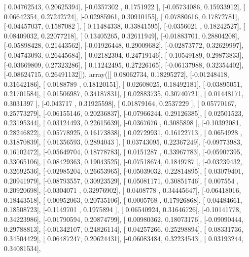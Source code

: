 \documentclass{article}
\begin{document}
       [ 0.04762543,  0.20625394],
       [-0.0357302 ,  0.1751922 ],
       [-0.05734086,  0.15933912],
       [ 0.06642354,  0.27242724],
       [-0.02985961,  0.30910155],
       [ 0.07880616,  0.17872781],
       [-0.04457037,  0.1587082 ],
       [ 0.11484338,  0.33841595],
       [-0.0356021 ,  0.18242527],
       [ 0.08409032,  0.22077218],
       [ 0.13405265,  0.32611949],
       [-0.01883701,  0.28804208],
       [-0.05898428,  0.21443562],
       [-0.01926448,  0.29009682],
       [-0.02873772,  0.32629997],
       [-0.04743093,  0.26445684],
       [ 0.02182304,  0.24719146],
       [ 0.10549189,  0.29873833],
       [-0.03669809,  0.27323286],
       [ 0.11242495,  0.27226165],
       [-0.06137988,  0.32354402],
       [-0.08624715,  0.26491132]]), array([[ 0.08062734,  0.18295272],
       [-0.01248418,  0.31642186],
       [ 0.0188789 ,  0.18120151],
       [ 0.02608025,  0.18492181],
       [-0.03895051,  0.21701584],
       [ 0.01506987,  0.34187831],
       [ 0.02883735,  0.30740721],
       [ 0.01448171,  0.3031397 ],
       [-0.043717  ,  0.31925598],
       [ 0.01879164,  0.2537229 ],
       [ 0.05770167,  0.25773279],
       [-0.06155146,  0.20236837],
       [-0.07966244,  0.29126385],
       [ 0.02501523,  0.23195344],
       [ 0.03124493,  0.22615639],
       [-0.0367676 ,  0.3085898 ],
       [-0.10392081,  0.28246822],
       [ 0.05778925,  0.16173838],
       [ 0.02729931,  0.16122713],
       [ 0.0654928 ,  0.31870839],
       [ 0.01356593,  0.2894043 ],
       [ 0.03743095,  0.22367249],
       [-0.09773983,  0.16102472],
       [-0.05649704,  0.18778783],
       [ 0.0151287 ,  0.33967783],
       [-0.05907395,  0.33065106],
       [ 0.08429363,  0.19043525],
       [-0.07518674,  0.1849787 ],
       [-0.03239432,  0.32692536],
       [-0.02985204,  0.26653965],
       [-0.05039032,  0.22814895],
       [ 0.03079401,  0.20941979],
       [-0.08793557,  0.30923529],
       [ 0.05081171,  0.30851746],
       [ 0.007554  ,  0.20920698],
       [-0.0304071 ,  0.32976902],
       [ 0.0408778 ,  0.34445647],
       [-0.06418016,  0.18443518],
       [ 0.00952063,  0.20735106],
       [-0.0005768 ,  0.17926868],
       [-0.04484661,  0.18508723],
       [-0.1149701 ,  0.1975894 ],
       [ 0.06540924,  0.31646726],
       [-0.10141778,  0.34223986],
       [-0.01790594,  0.20874799],
       [ 0.00980362,  0.18073176],
       [-0.09090444,  0.29788813],
       [-0.01342107,  0.24826114],
       [ 0.04257266,  0.25298894],
       [ 0.08331736,  0.34504429],
       [ 0.06487247,  0.20624431],
       [-0.06083484,  0.32234543],
       [ 0.03193244,  0.34081534],
\end{document}

